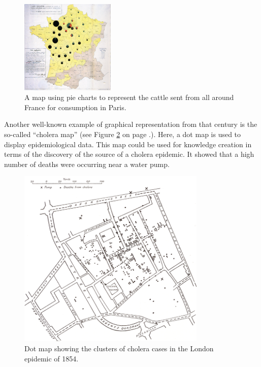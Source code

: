 \begin{figure}[!htb]
\centering
\includegraphics[width=0.4\textwidth,keepaspectratio]{images/history/minard.png}
\caption[
    A map using pie charts to represent the cattle sent from all around France for consumption in Paris., Urldate: 07.2016 \newline
\small\texttt{\url{https://upload.wikimedia.org/wikipedia/commons/1/1c/Minard-carte-viande-1858.png}}
]{A map using pie charts to represent the cattle sent from all around France for consumption in Paris.}
\label{fig:first-mixture}
\end{figure}

Another well-known example of graphical representation from that century is the so-called ``cholera map'' (see Figure \ref{fig:cholera-map} on page \pageref{fig:cholera-map}.). Here, a dot map is used to display epidemiological data. This map could be used for knowledge creation in terms of the discovery of the source of a cholera epidemic. It showed that a high number of deaths were occurring near a water pump.

\begin{figure}[!htb]
\centering
\includegraphics[width=0.8\textwidth,keepaspectratio]{images/history/cholera2.png}
\caption[
    Dot map showing the clusters of cholera cases in the London epidemic of 1854., Urldate: 07.2016 \newline
\small\texttt{\url{http://datavis.ca/milestones//admin/uploads/images/tufte/snow.gif}}
]{Dot map showing the clusters of cholera cases in the London epidemic of 1854.}
\label{fig:cholera-map}
\end{figure}

